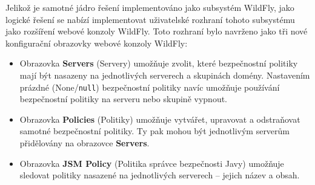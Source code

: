 Jelikož je samotné jádro řešení implementováno jako subsystém WildFly, jako logické řešení se nabízí implementovat uživatelské rozhraní tohoto subsystému jako rozšíření webové konzoly WildFly.
Toto rozhraní bylo navrženo jako tři nové konfigurační obrazovky webové konzoly WildFly:

\begin{itemize}
  \item Obrazovka {\bf Servers} (Servery) umožňuje zvolit, které bezpečnostní politiky mají být nasazeny na jednotlivých serverech a skupinách domény. Nastavením prázdné (None/{\tt null}) bezpečnostní politiky navíc umožňuje používání bezpečnostní politiky na serveru nebo skupině vypnout.
  \item Obrazovka {\bf Policies} (Politiky) umožňuje vytvářet, upravovat a odstraňovat samotné bezpečnostní politiky. Ty pak mohou být jednotlivým serverům přidělovány na obrazovce {\bf Servers}.
  \item Obrazovka {\bf JSM Policy} (Politika správce bezpečnosti Javy) umožňuje sledovat politiky nasazené na jednotlivých serverech -- jejich název a obsah.
\end{itemize}

